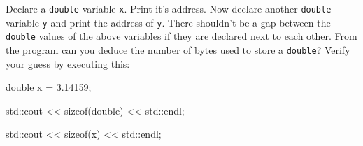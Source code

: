 Declare a \texttt{double} variable \texttt{x}. Print it's address. Now declare another \texttt{double} variable \texttt{y} and print the address of \texttt{y}. There shouldn't be a gap between the \texttt{double} values of the above variables if they are declared next to each other. From the program can you deduce the number of bytes used to store a \texttt{double}? Verify your guess by executing this:

\begin{consolethree}[escapeinside=||]

double x = 3.14159;

std::cout << sizeof(double) << std::endl;

std::cout << sizeof(x) << std::endl;

\end{consolethree}


